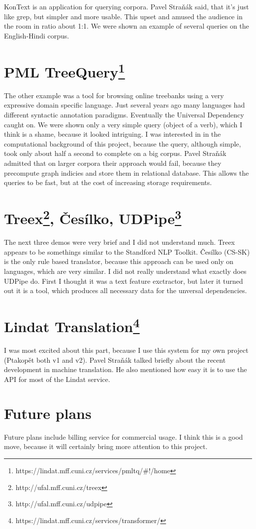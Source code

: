 \documentclass[a4paper]{article}
\begin{document}
KonText is an application for querying corpora. Pavel Straňák said, that it's just like grep, but simpler and more usable. This upset and amused the audience in the room in ratio about 1:1. We were shown an example of several queries on the English-Hindi corpus.

\section*{PML TreeQuery\footnote{https://lindat.mff.cuni.cz/services/pmltq/\#!/home}}

The other example was a tool for browsing online treebanks using a very expressive domain specific language. Just several years ago many languages had different syntactic annotation paradigms. Eventually the Universal Dependency caught on. We were shown only a very simple query (object of a verb), which I think is a shame, because it looked intriguing. I was interested in in the computational background of this project, because the query, although simple, took only about half a second to complete on a big corpus. Pavel Straňák admitted that on larger corpora their approach would fail, because they precompute graph indicies and store them in relational database. This allows the queries to be fast, but at the cost of increasing storage requirements.

\pagebreak{}

\section*{Treex\footnote{http://ufal.mff.cuni.cz/treex}, Česílko, UDPipe\footnote{http://ufal.mff.cuni.cz/udpipe}}

The next three demos were very brief and I did not understand much. Treex appears to be somethings similar to the Standford NLP Toolkit. Česílko (CS-SK) is the only rule based translator, because this approach can be used only on languages, which are very similar. I did not really understand what exactly does UDPipe do. First I thought it was a text feature exctractor, but later it turned out it is a tool, which produces all necessary data for the unversal dependencies.

\section*{Lindat Translation\footnote{https://lindat.mff.cuni.cz/services/transformer/}}

I was most excited about this part, because I use this system for my own project (Ptakopět both v1 and v2). Pavel Straňák talked briefly about the recent development in machine translation. He also mentioned how easy it is to use the API for most of the Lindat service.

\section*{Future plans}

Future plans include billing service for commercial usage. I think this is a good move, because it will certainly bring more attention to this project.
\end{document}
